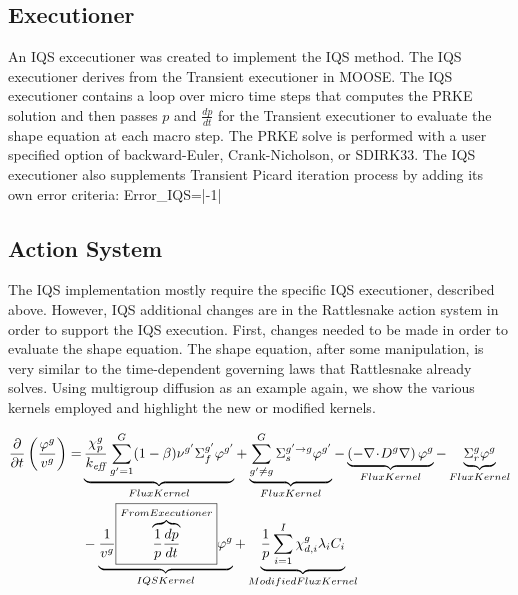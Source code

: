  
\subsection{Executioner}

An IQS excecutioner was created to implement the IQS method. The IQS executioner derives from the Transient executioner in MOOSE.  The IQS executioner contains a loop over micro time steps that computes the PRKE solution and then passes $p$ and $\frac{dp}{dt}$ for the Transient executioner to evaluate the shape equation at each macro step.  The PRKE solve is performed with a user specified option of backward-Euler, Crank-Nicholson, or SDIRK33.   The IQS executioner also supplements Transient Picard iteration process by adding its own error criteria:
\be
Error_{IQS}=\left|-1\right|
\label{eq:eiqs}
\ee

\subsection{Action System}

The IQS implementation mostly require the specific IQS executioner, described above. However, IQS additional changes are in the Rattlesnake action system in order to support the IQS execution.  First, changes needed to be made in order to evaluate the shape equation.  The shape equation, after some manipulation, is very similar to the time-dependent governing laws that Rattlesnake already solves. Using multigroup diffusion as an example again, we show the various kernels employed and highlight the new or modified kernels.

\begin{align}
\frac{\partial}{\partial t}\left(\frac{\varphi^g}{v^g}\right)=&\underbrace{\frac{\chi_p^g}{k_\textit{eff}} \sum_{g'=1}^G (1-\beta) \nu^{g'} \Sigma_f^{g'} \varphi^{g'}}_{Flux Kernel} + \underbrace{\sum_{g'\neq g}^G\Sigma_s^{g'\to g} \varphi^{g'}}_{Flux Kernel} - \underbrace{\left( -\mathbf{\nabla}\! \cdot \! D^g \mathbf{\nabla} \right)\varphi^g}_{Flux Kernel} - \underbrace{\Sigma_r^g\varphi^g}_{Flux Kernel} \nonumber \\
& - \underbrace{\frac{1}{v^g} \boxed{\overbrace{\frac{1}{p}\frac{dp}{dt}}^{From Executioner}}\varphi^g}_{IQS Kernel}+\underbrace{\frac{1}{p}\sum_{i=1}^I\chi_{d,i}^g\lambda_iC_i}_{Modified Flux Kernel}
\end{align}

